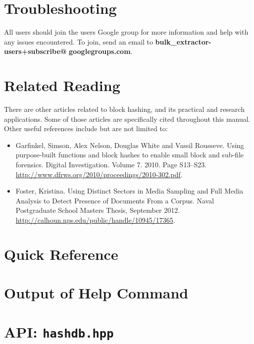 \documentclass[11pt,fleqn]{article} %
\begin{document}



\section{Troubleshooting}
\label{DebuggingHashdb}
All \hash users should join the \bulk users Google group for more information and help with any issues encountered. To join, send an email to \textbf{bulk\_extractor-users+subscribe@} \textbf{googlegroups.com}.  \\
\section{Related Reading}
There are other articles related to block hashing, and its practical and research applications. Some of those articles are specifically cited throughout this manual. Other useful references include but are not limited to:
\begin{itemize}
\item Garfinkel, Simson, Alex Nelson, Douglas White and Vassil Rousseve. Using purpose-built functions and block hashes to enable small block and sub-file forensics. Digital Investigation. Volume 7. 2010. Page S13--S23. \url{http://www.dfrws.org/2010/proceedings/2010-302.pdf}.
\item Foster, Kristina. Using Distinct Sectors in Media Sampling and Full Media Analysis to Detect Presence of Documents From a Corpus. Naval Postgraduate School Masters Thesis, September 2012. \url{http://calhoun.nps.edu/public/handle/10945/17365}.
\end{itemize}

 


\newpage
\appendix
\appendixpage

\section{\hash Quick Reference}
\label{QuickReference}

\newpage

\section{Output of \hash Help Command}
\label{HelpOutput}
\begingroup
\footnotesize
{
\selectfont

}
\endgroup


\section{\hash API: \texttt{hashdb.hpp}}
\label{hashdbapi}
\lstset{language=C++}
\lstset{basicstyle=\footnotesize}
\lstset{breaklines=true}
\lstset{breakatwhitespace=true}

\end{document}
